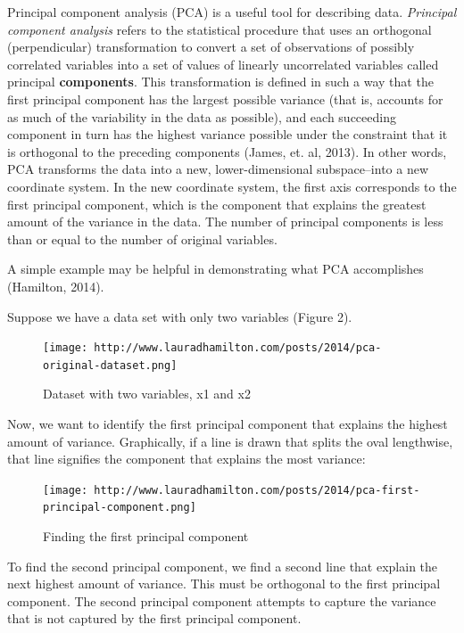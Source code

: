 \documentclass[12pt,twoside]{reedthesis}
\begin{document}
  Principal component analysis (PCA) is a useful tool for describing data.
  \emph{Principal component analysis} refers to the statistical procedure
  that uses an orthogonal (perpendicular) transformation to convert a set
  of observations of possibly correlated variables into a set of values of
  linearly uncorrelated variables called principal \textbf{components}.
  This transformation is defined in such a way that the first principal
  component has the largest possible variance (that is, accounts for as
  much of the variability in the data as possible), and each succeeding
  component in turn has the highest variance possible under the constraint
  that it is orthogonal to the preceding components (James, et. al, 2013).
  In other words, PCA transforms the data into a new, lower-dimensional
  subspace--into a new coordinate system. In the new coordinate system,
  the first axis corresponds to the first principal component, which is
  the component that explains the greatest amount of the variance in the
  data. The number of principal components is less than or equal to the
  number of original variables.
  
  A simple example may be helpful in demonstrating what PCA accomplishes
  (Hamilton, 2014).
  
  Suppose we have a data set with only two variables (Figure 2).
  
  \begin{figure}[htbp]
  \centering
  \texttt{[image: http://www.lauradhamilton.com/posts/2014/pca-original-dataset.png]}
  \caption{Dataset with two variables, x1 and x2}
  \end{figure}
  
  Now, we want to identify the first principal component that explains the
  highest amount of variance. Graphically, if a line is drawn that splits
  the oval lengthwise, that line signifies the component that explains the
  most variance:
  
  \begin{figure}[htbp]
  \centering
  \texttt{[image: http://www.lauradhamilton.com/posts/2014/pca-first-principal-component.png]}
  \caption{Finding the first principal component}
  \end{figure}
  
  \newpage
  
  To find the second principal component, we find a second line that
  explain the next highest amount of variance. This must be orthogonal to
  the first principal component. The second principal component attempts
  to capture the variance that is not captured by the first principal
  component.
  
\end{document}
